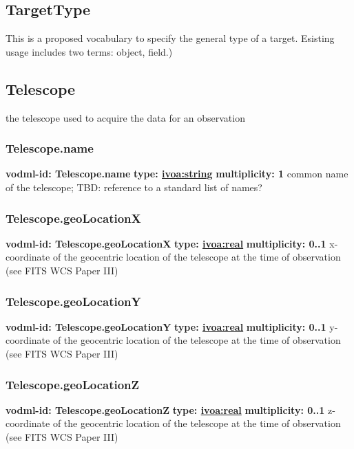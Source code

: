   \subsection{TargetType}
  \label{sect:TargetType}
    This is a proposed vocabulary to specify the general type of a target. Esisting usage includes two terms: object, field.)

  \subsection{Telescope}
  \label{sect:Telescope}
    the telescope used to acquire the data for an observation

    \subsubsection{Telescope.name}
      \textbf{vodml-id: Telescope.name} \newline
      \textbf{type: \hyperref[sect:ivoa]{ivoa:string}} \newline
      \textbf{multiplicity: 1} \newline
      common name of the telescope; TBD: reference to a standard list of names?

    \subsubsection{Telescope.geoLocationX}
      \textbf{vodml-id: Telescope.geoLocationX} \newline
      \textbf{type: \hyperref[sect:ivoa]{ivoa:real}} \newline
      \textbf{multiplicity: 0..1} \newline
      x-coordinate of the geocentric location of the telescope at the time of observation (see FITS WCS Paper III)

    \subsubsection{Telescope.geoLocationY}
      \textbf{vodml-id: Telescope.geoLocationY} \newline
      \textbf{type: \hyperref[sect:ivoa]{ivoa:real}} \newline
      \textbf{multiplicity: 0..1} \newline
      y-coordinate of the geocentric location of the telescope at the time of observation (see FITS WCS Paper III)

    \subsubsection{Telescope.geoLocationZ}
      \textbf{vodml-id: Telescope.geoLocationZ} \newline
      \textbf{type: \hyperref[sect:ivoa]{ivoa:real}} \newline
      \textbf{multiplicity: 0..1} \newline
      z-coordinate of the geocentric location of the telescope at the time of observation (see FITS WCS Paper III)

